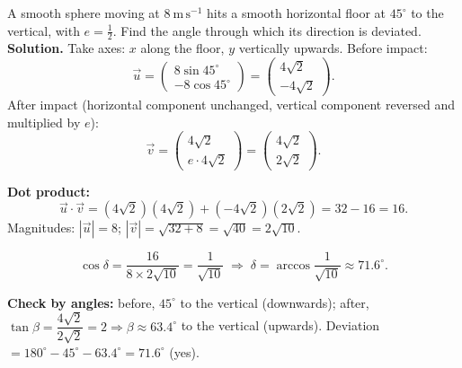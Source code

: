 \documentclass[11pt]{article}
\begin{document}
\begin{exoresolu}
A smooth sphere moving at $8\ \mathrm{m\,s^{-1}}$ hits a smooth horizontal floor at $45^{\circ}$ to the vertical, with $e = \tfrac{1}{2}$. Find the angle through which its direction is deviated.
\tcblower
\textbf{Solution.} Take axes: $x$ along the floor, $y$ vertically upwards. Before impact:
\[ \vec{u} = \begin{pmatrix} 8\sin 45^{\circ} \\ -8\cos 45^{\circ} \end{pmatrix} = \begin{pmatrix} 4\sqrt{2} \\ -4\sqrt{2} \end{pmatrix}. \]
After impact (horizontal component unchanged, vertical component reversed and multiplied by $e$):
\[ \vec{v} = \begin{pmatrix} 4\sqrt{2} \\ e\cdot 4\sqrt{2} \end{pmatrix} = \begin{pmatrix} 4\sqrt{2} \\ 2\sqrt{2} \end{pmatrix}. \]

\textbf{Dot product:}
\[ \vec{u}\cdot\vec{v} = (4\sqrt{2})(4\sqrt{2}) + (-4\sqrt{2})(2\sqrt{2}) = 32 - 16 = 16. \]
Magnitudes: $|\vec{u}| = 8$; $|\vec{v}| = \sqrt{32 + 8} = \sqrt{40} = 2\sqrt{10}$.

\[ \cos\delta = \frac{16}{8 \times 2\sqrt{10}} = \frac{1}{\sqrt{10}} \;\Longrightarrow\; \delta = \arccos\frac{1}{\sqrt{10}} \approx 71.6^{\circ}. \]

\textbf{Check by angles:} before, $45^{\circ}$ to the vertical (downwards); after, $\tan\beta = \dfrac{4\sqrt{2}}{2\sqrt{2}} = 2 \Rightarrow \beta \approx 63.4^{\circ}$ to the vertical (upwards). Deviation $= 180^{\circ} - 45^{\circ} - 63.4^{\circ} = 71.6^{\circ}$ (yes).
\end{exoresolu}
\end{document}

